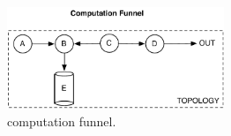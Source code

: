 \begin{figure}
	\begin{center}
		\includegraphics[width=6.5cm]{images/funnel}
		\caption{computation funnel.}
		\label{fig:funnel}
	\end{center}
\end{figure}

%
%
%
%
%
%
